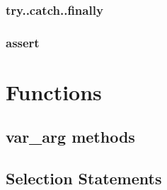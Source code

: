 \documentclass[14pt,fleqn]{extbook} %
\begin{document}
\subsection{try..catch..finally}
%
\subsection{assert}
%

\chapter{Functions}
\section{var\_arg methods}

\section{Selection Statements}



%
%
%
\end{document}
